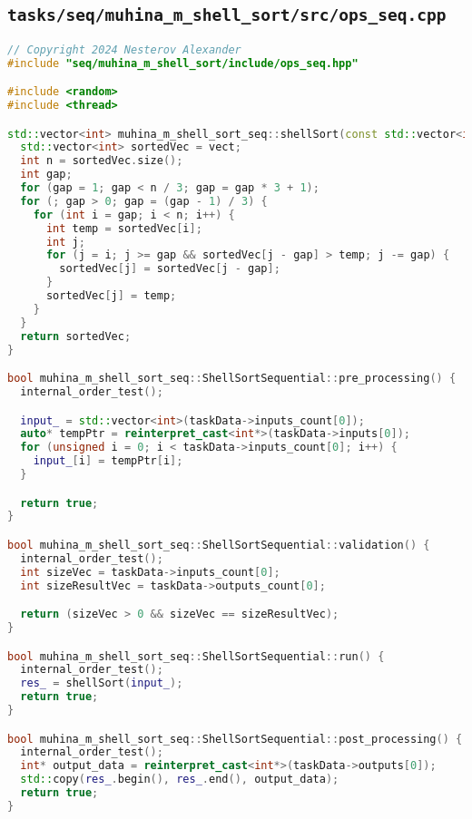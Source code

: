 \documentclass[12pt]{article}
\begin{document}
\subsection*{\texttt{tasks/seq/muhina\_m\_shell\_sort/src/ops\_seq.cpp}}

\begin{lstlisting}[language=C++]
// Copyright 2024 Nesterov Alexander
#include "seq/muhina_m_shell_sort/include/ops_seq.hpp"

#include <random>
#include <thread>

std::vector<int> muhina_m_shell_sort_seq::shellSort(const std::vector<int>& vect) {
  std::vector<int> sortedVec = vect;
  int n = sortedVec.size();
  int gap;
  for (gap = 1; gap < n / 3; gap = gap * 3 + 1);
  for (; gap > 0; gap = (gap - 1) / 3) {
    for (int i = gap; i < n; i++) {
      int temp = sortedVec[i];
      int j;
      for (j = i; j >= gap && sortedVec[j - gap] > temp; j -= gap) {
        sortedVec[j] = sortedVec[j - gap];
      }
      sortedVec[j] = temp;
    }
  }
  return sortedVec;
}

bool muhina_m_shell_sort_seq::ShellSortSequential::pre_processing() {
  internal_order_test();

  input_ = std::vector<int>(taskData->inputs_count[0]);
  auto* tempPtr = reinterpret_cast<int*>(taskData->inputs[0]);
  for (unsigned i = 0; i < taskData->inputs_count[0]; i++) {
    input_[i] = tempPtr[i];
  }

  return true;
}

bool muhina_m_shell_sort_seq::ShellSortSequential::validation() {
  internal_order_test();
  int sizeVec = taskData->inputs_count[0];
  int sizeResultVec = taskData->outputs_count[0];

  return (sizeVec > 0 && sizeVec == sizeResultVec);
}

bool muhina_m_shell_sort_seq::ShellSortSequential::run() {
  internal_order_test();
  res_ = shellSort(input_);
  return true;
}

bool muhina_m_shell_sort_seq::ShellSortSequential::post_processing() {
  internal_order_test();
  int* output_data = reinterpret_cast<int*>(taskData->outputs[0]);
  std::copy(res_.begin(), res_.end(), output_data);
  return true;
}

\end{lstlisting}
\end{document}
